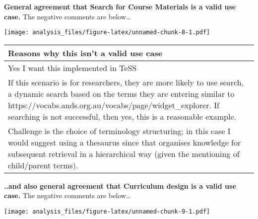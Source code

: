 \documentclass[]{article}
\begin{document}
\textbf{General agreement that Search for Course Materials is a valid
use case.} The negative comments are below\ldots{}

\texttt{[image: analysis\_files/figure-latex/unnamed-chunk-8-1.pdf]}

\begin{table}[H]
\centering
\begin{tabular}{>{\raggedright\arraybackslash\columncolor{khaki}}p{30em}}
\hline
Reasons why this isn't a valid use case\\
\hline
Yes I want this implemented in TeSS\\
\hline
If this scenario is for researchers, they are more likely to use search, a dynamic search based on the terms they are entering similar to https://vocabs.ands.org.au/vocabs/page/widget\_explorer. If searching is not successful, then yes, this is a reasonable example.\\
\hline
Challenge is the choice of terminology structuring; in this case I would suggest using a thesaurus since that organises knowledge for subsequent retrieval in a hierarchical way (given the mentioning of child/parent terms).\\
\hline
\end{tabular}
\end{table}

\textbf{..and also general agreement that Curriculum design is a valid
use case.} The negative comments are below\ldots{}

\texttt{[image: analysis\_files/figure-latex/unnamed-chunk-9-1.pdf]}
\end{document}
